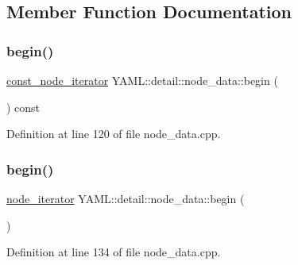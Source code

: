 \subsection{Member Function Documentation}
\mbox{\label{class_y_a_m_l_1_1detail_1_1node__data_aee8d9e1ee89a512c2df989c513ab5eba}} 
\subsubsection{\texorpdfstring{begin()}{begin()}\hspace{0.1cm}{\footnotesize\ttfamily [1/2]}}
{\footnotesize\ttfamily \mbox{\hyperlink{namespace_y_a_m_l_1_1detail_a049af8e269401cbe1e735033914e4356}{const\+\_\+node\+\_\+iterator}} Y\+A\+M\+L\+::detail\+::node\+\_\+data\+::begin (\begin{DoxyParamCaption}{ }\end{DoxyParamCaption}) const}



Definition at line 120 of file node\+\_\+data.\+cpp.

\mbox{\label{class_y_a_m_l_1_1detail_1_1node__data_a09fccbdf67e54810dfd5d4cf3a6e8b8f}} 
\subsubsection{\texorpdfstring{begin()}{begin()}\hspace{0.1cm}{\footnotesize\ttfamily [2/2]}}
{\footnotesize\ttfamily \mbox{\hyperlink{namespace_y_a_m_l_1_1detail_aa2a961156810d41a3b6744c10186afac}{node\+\_\+iterator}} Y\+A\+M\+L\+::detail\+::node\+\_\+data\+::begin (\begin{DoxyParamCaption}{ }\end{DoxyParamCaption})}



Definition at line 134 of file node\+\_\+data.\+cpp.

\mbox{\label{class_y_a_m_l_1_1detail_1_1node__data_a2f80d978fb75e02fdf65353d0685c3af}} 
